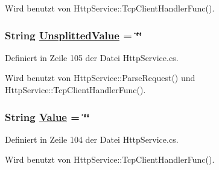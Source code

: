 Wird benutzt von Http\-Service::Tcp\-Client\-Handler\-Func().\hypertarget{classQbeSAS_1_1HttpService_1_1UriGetParameter_QbeSAS_1_1HttpService_1_1UriGetParametero3}{
\subsubsection[UnsplittedValue]{\setlength{\rightskip}{0pt plus 5cm}String \hyperlink{classQbeSAS_1_1HttpService_1_1UriGetParameter_QbeSAS_1_1HttpService_1_1UriGetParametero3}{Unsplitted\-Value} = \char`\"{}\char`\"{}}}
\label{classQbeSAS_1_1HttpService_1_1UriGetParameter_QbeSAS_1_1HttpService_1_1UriGetParametero3}




Definiert in Zeile 105 der Datei Http\-Service.cs.

Wird benutzt von Http\-Service::Parse\-Request() und Http\-Service::Tcp\-Client\-Handler\-Func().\hypertarget{classQbeSAS_1_1HttpService_1_1UriGetParameter_QbeSAS_1_1HttpService_1_1UriGetParametero2}{
\subsubsection[Value]{\setlength{\rightskip}{0pt plus 5cm}String \hyperlink{classQbeSAS_1_1HttpService_1_1UriGetParameter_QbeSAS_1_1HttpService_1_1UriGetParametero2}{Value} = \char`\"{}\char`\"{}}}
\label{classQbeSAS_1_1HttpService_1_1UriGetParameter_QbeSAS_1_1HttpService_1_1UriGetParametero2}




Definiert in Zeile 104 der Datei Http\-Service.cs.

Wird benutzt von Http\-Service::Tcp\-Client\-Handler\-Func().